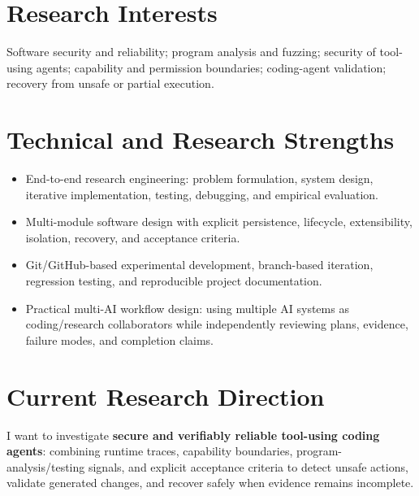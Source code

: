 \documentclass[10pt,a4paper]{article}
\begin{document}
\section{Research Interests}
Software security and reliability; program analysis and fuzzing; security of tool-using agents; capability and permission boundaries; coding-agent validation; recovery from unsafe or partial execution.

\section{Technical and Research Strengths}
\begin{itemize}
  \item End-to-end research engineering: problem formulation, system design, iterative implementation, testing, debugging, and empirical evaluation.
  \item Multi-module software design with explicit persistence, lifecycle, extensibility, isolation, recovery, and acceptance criteria.
  \item Git/GitHub-based experimental development, branch-based iteration, regression testing, and reproducible project documentation.
  \item Practical multi-AI workflow design: using multiple AI systems as coding/research collaborators while independently reviewing plans, evidence, failure modes, and completion claims.
\end{itemize}

\section{Current Research Direction}
I want to investigate \textbf{secure and verifiably reliable tool-using coding agents}: combining runtime traces, capability boundaries, program-analysis/testing signals, and explicit acceptance criteria to detect unsafe actions, validate generated changes, and recover safely when evidence remains incomplete.
\end{document}
